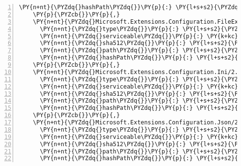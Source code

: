 \begin{Verbatim}[commandchars=\\\{\},numbers=left,firstnumber=1,stepnumber=1,numberblanklines=0]
      \PY{n+nt}{\PYZdq{}hashPath\PYZdq{}}\PY{p}{:} \PY{l+s+s2}{\PYZdq{}microsoft.extensions.configuration.environmentvariables.2.1.0\PYZhy{}rc1\PYZhy{}final.nupkg.sha512\PYZdq{}}
    \PY{p}{\PYZcb{}}\PY{p}{,}
    \PY{n+nt}{\PYZdq{}Microsoft.Extensions.Configuration.FileExtensions/2.1.0\PYZhy{}rc1\PYZhy{}final\PYZdq{}}\PY{p}{:} \PY{p}{\PYZob{}}
      \PY{n+nt}{\PYZdq{}type\PYZdq{}}\PY{p}{:} \PY{l+s+s2}{\PYZdq{}package\PYZdq{}}\PY{p}{,}
      \PY{n+nt}{\PYZdq{}serviceable\PYZdq{}}\PY{p}{:} \PY{k+kc}{true}\PY{p}{,}
      \PY{n+nt}{\PYZdq{}sha512\PYZdq{}}\PY{p}{:} \PY{l+s+s2}{\PYZdq{}sha512\PYZhy{}Cekuljnhb9YfuYkGqPgSVJWg6APXayghiz9MtAXG774dd7CUESStpn1+QJnjLRu3OuvZWjEcxW6PrOKciQcR4Q==\PYZdq{}}\PY{p}{,}
      \PY{n+nt}{\PYZdq{}path\PYZdq{}}\PY{p}{:} \PY{l+s+s2}{\PYZdq{}microsoft.extensions.configuration.fileextensions/2.1.0\PYZhy{}rc1\PYZhy{}final\PYZdq{}}\PY{p}{,}
      \PY{n+nt}{\PYZdq{}hashPath\PYZdq{}}\PY{p}{:} \PY{l+s+s2}{\PYZdq{}microsoft.extensions.configuration.fileextensions.2.1.0\PYZhy{}rc1\PYZhy{}final.nupkg.sha512\PYZdq{}}
    \PY{p}{\PYZcb{}}\PY{p}{,}
    \PY{n+nt}{\PYZdq{}Microsoft.Extensions.Configuration.Ini/2.1.0\PYZhy{}rc1\PYZhy{}final\PYZdq{}}\PY{p}{:} \PY{p}{\PYZob{}}
      \PY{n+nt}{\PYZdq{}type\PYZdq{}}\PY{p}{:} \PY{l+s+s2}{\PYZdq{}package\PYZdq{}}\PY{p}{,}
      \PY{n+nt}{\PYZdq{}serviceable\PYZdq{}}\PY{p}{:} \PY{k+kc}{true}\PY{p}{,}
      \PY{n+nt}{\PYZdq{}sha512\PYZdq{}}\PY{p}{:} \PY{l+s+s2}{\PYZdq{}sha512\PYZhy{}4V+zoROxWbe8wTf6DnpoyP/gzMW6gph+To9F3o158whVZ8DxqQr4DWpGIl5aB5q5NI+7hiMYX6VAy3vURF7FDA==\PYZdq{}}\PY{p}{,}
      \PY{n+nt}{\PYZdq{}path\PYZdq{}}\PY{p}{:} \PY{l+s+s2}{\PYZdq{}microsoft.extensions.configuration.ini/2.1.0\PYZhy{}rc1\PYZhy{}final\PYZdq{}}\PY{p}{,}
      \PY{n+nt}{\PYZdq{}hashPath\PYZdq{}}\PY{p}{:} \PY{l+s+s2}{\PYZdq{}microsoft.extensions.configuration.ini.2.1.0\PYZhy{}rc1\PYZhy{}final.nupkg.sha512\PYZdq{}}
    \PY{p}{\PYZcb{}}\PY{p}{,}
    \PY{n+nt}{\PYZdq{}Microsoft.Extensions.Configuration.Json/2.1.0\PYZhy{}rc1\PYZhy{}final\PYZdq{}}\PY{p}{:} \PY{p}{\PYZob{}}
      \PY{n+nt}{\PYZdq{}type\PYZdq{}}\PY{p}{:} \PY{l+s+s2}{\PYZdq{}package\PYZdq{}}\PY{p}{,}
      \PY{n+nt}{\PYZdq{}serviceable\PYZdq{}}\PY{p}{:} \PY{k+kc}{true}\PY{p}{,}
      \PY{n+nt}{\PYZdq{}sha512\PYZdq{}}\PY{p}{:} \PY{l+s+s2}{\PYZdq{}sha512\PYZhy{}Io8K3ZBo+sJX5N+pKN5a6LITMnMnfyNjBNjLA/s32ML1xh5acMMwvI95zljdCZ1jwNWIOuF1sxMQOIYJK0ItxQ==\PYZdq{}}\PY{p}{,}
      \PY{n+nt}{\PYZdq{}path\PYZdq{}}\PY{p}{:} \PY{l+s+s2}{\PYZdq{}microsoft.extensions.configuration.json/2.1.0\PYZhy{}rc1\PYZhy{}final\PYZdq{}}\PY{p}{,}
      \PY{n+nt}{\PYZdq{}hashPath\PYZdq{}}\PY{p}{:} \PY{l+s+s2}{\PYZdq{}microsoft.extensions.configuration.json.2.1.0\PYZhy{}rc1\PYZhy{}final.nupkg.sha512\PYZdq{}}

\end{Verbatim}
